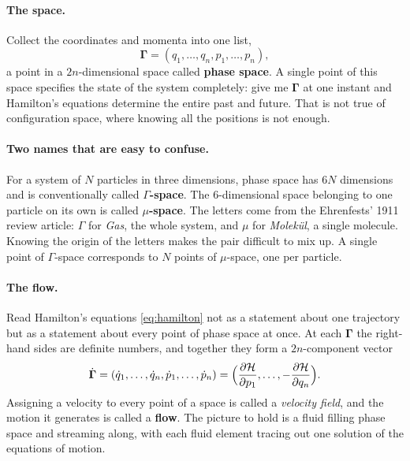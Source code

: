 \documentclass[12pt]{article}
\renewcommand{\vec}[1]{\bm{#1}}
\newcommand{\Ham}{\mathcal{H}}
\begin{document}
\paragraph{The space.}  Collect the coordinates and momenta into one
list,
%
\begin{equation}
  \vec\Gamma = (q_1,\ldots,q_n,p_1,\ldots,p_n) ,
  \label{eq:gamma}
\end{equation}
%
a point in a $2n$-dimensional space called \textbf{phase space}.  A
single point of this space specifies the state of the system
completely: give me $\vec\Gamma$ at one instant and Hamilton's
equations determine the entire past and future.  That is not true of
configuration space, where knowing all the positions is not enough.

\paragraph{Two names that are easy to confuse.}  For a system of $N$
particles in three dimensions, phase space has $6N$ dimensions and is
conventionally called \textbf{$\Gamma$-space}.  The $6$-dimensional
space belonging to one particle on its own is called
\textbf{$\mu$-space}.  The letters come from the Ehrenfests' 1911
review article: $\Gamma$ for \emph{Gas}, the whole system, and $\mu$
for \emph{Molek\"ul}, a single molecule.  Knowing the origin of the
letters makes the pair difficult to mix up.  A single point of
$\Gamma$-space corresponds to $N$ points of $\mu$-space, one per
particle.

\paragraph{The flow.}  Read Hamilton's equations \eqref{eq:hamilton}
not as a statement about one trajectory but as a statement about every
point of phase space at once.  At each $\vec\Gamma$ the right-hand
sides are definite numbers, and together they form a
$2n$-component vector
%
\begin{equation}
  \dot{\vec\Gamma} = (\dot q_1,\ldots,\dot q_n,
                      \dot p_1,\ldots,\dot p_n)
    = \Bigl(\frac{\partial\Ham}{\partial p_1},\ldots,
            -\frac{\partial\Ham}{\partial q_n}\Bigr) .
  \label{eq:gamma_dot}
\end{equation}
%
Assigning a velocity to every point of a space is called a
\emph{velocity field}, and the motion it generates is called a
\textbf{flow}.  The picture to hold is a fluid filling phase space and
streaming along, with each fluid element tracing out one solution of
the equations of motion.
\end{document}
